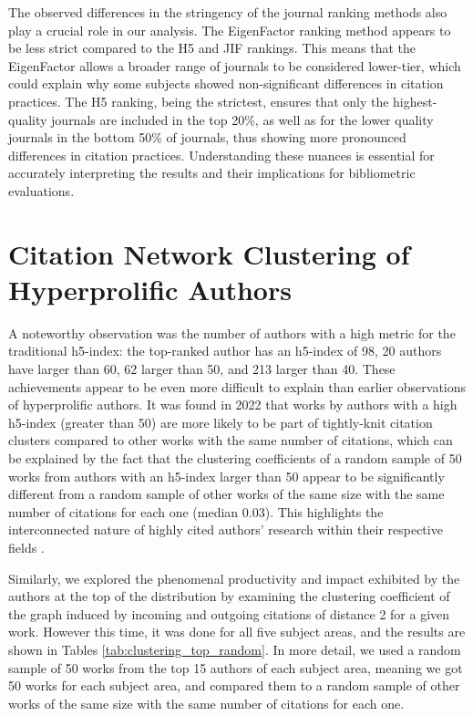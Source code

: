The observed differences in the stringency of the journal ranking methods also
play a crucial role in our analysis. The EigenFactor ranking method appears to
be less strict compared to the H5 and JIF rankings. This means that the
EigenFactor allows a broader range of journals to be considered lower-tier,
which could explain why some subjects showed non-significant differences in
citation practices. The H5 ranking, being the strictest, ensures that only the
highest-quality journals are included in the top 20\%, as well as for the lower
quality journals in the bottom 50\% of journals, thus showing more pronounced
differences in citation practices. Understanding these nuances is essential for
accurately interpreting the results and their implications for bibliometric
evaluations.

\section{Citation Network Clustering of Hyperprolific Authors}

A noteworthy observation was the number of authors with a high metric for the
traditional h5-index: the top-ranked author has an h5-index of 98, 20 authors
have larger than 60, 62 larger than 50, and 213 larger than 40. These
achievements appear to be even more difficult to explain than earlier
observations of hyperprolific authors. It was found in 2022 that works by
authors with a high h5-index (greater than 50) are more likely to be part of
tightly-knit citation clusters compared to other works with the same number of
citations, which can be explained by the fact that the clustering coefficients
of a random sample of 50 works from authors with an h5-index larger than 50
appear to be significantly different from a random sample of other works of the
same size with the same number of citations for each one (median 0.03). This
highlights the interconnected nature of highly cited authors' research within
their respective fields \cite{Spi23g}.

Similarly, we explored the phenomenal productivity and impact exhibited by the
authors at the top of the distribution by examining the clustering coefficient
of the graph induced by incoming and outgoing citations of distance 2 for a
given work. However this time, it was done for all five subject areas, and the
results are shown in Tables \ref{tab:clustering_top_random}. In more detail, we
used a random sample of 50 works from the top 15 authors of each subject area,
meaning we got 50 works for each subject area, and compared them to a random
sample of other works of the same size with the same number of citations for
each one. %

